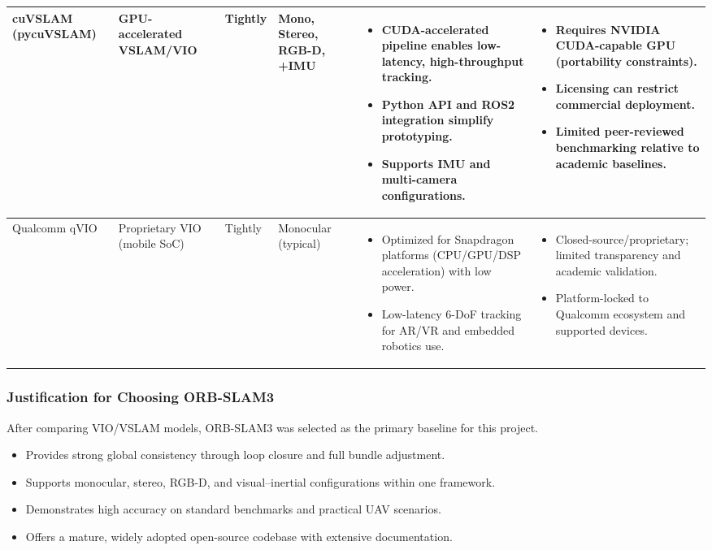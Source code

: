 \begin{table}[H]
{\begin{tabular}{|p{1.6cm}|p{1.9cm}|p{1.4cm}|p{1.9cm}|p{4.1cm}|p{4.1cm}|}
\hline cuVSLAM (pycuVSLAM) & GPU-accelerated VSLAM/VIO & Tightly & Mono, Stereo, RGB-D, +IMU &
\begin{itemize}[leftmargin=*, topsep=0pt, itemsep=0pt, parsep=0pt, partopsep=0pt]
  \item CUDA-accelerated pipeline enables low-latency, high-throughput tracking.
  \item Python API and ROS2 integration simplify prototyping.
  \item Supports IMU and multi-camera configurations.
\end{itemize} &
\begin{itemize}[leftmargin=*, topsep=0pt, itemsep=0pt, parsep=0pt, partopsep=0pt]
  \item Requires NVIDIA CUDA-capable GPU (portability constraints).
  \item Licensing can restrict commercial deployment.
  \item Limited peer-reviewed benchmarking relative to academic baselines.
\end{itemize} \\

\hline Qualcomm qVIO & Proprietary VIO (mobile SoC) & Tightly & Monocular (typical) &
\begin{itemize}[leftmargin=*, topsep=0pt, itemsep=0pt, parsep=0pt, partopsep=0pt]
  \item Optimized for Snapdragon platforms (CPU/GPU/DSP acceleration) with low power.
  \item Low-latency 6-DoF tracking for AR/VR and embedded robotics use.
\end{itemize} &
\begin{itemize}[leftmargin=*, topsep=0pt, itemsep=0pt, parsep=0pt, partopsep=0pt]
  \item Closed-source/proprietary; limited transparency and academic validation.
  \item Platform-locked to Qualcomm ecosystem and supported devices.
\end{itemize} \\

\hline \end{tabular}}
\label{tab:VINS_comparison}
\end{table}

\subsubsection{Justification for Choosing ORB-SLAM3}
After comparing VIO/VSLAM models, ORB-SLAM3 was selected as the primary baseline for this project.
\begin{itemize}
    \item Provides strong global consistency through loop closure and full bundle adjustment.
    \item Supports monocular, stereo, RGB-D, and visual--inertial configurations within one framework.
    \item Demonstrates high accuracy on standard benchmarks and practical UAV scenarios.
    \item Offers a mature, widely adopted open-source codebase with extensive documentation.
\end{itemize}